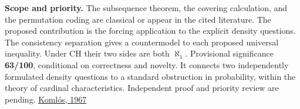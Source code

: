 \documentclass[11pt]{article}
\begin{document}
\textbf{Scope and priority.} The subsequence theorem, the covering calculation, and the permutation coding are classical or appear in the cited literature. The proposed contribution is the forcing application to the explicit density questions. The consistency separation gives a countermodel to each proposed universal inequality. Under CH their two sides are both \(\aleph_1\). Provisional significance \textbf{63/100}, conditional on correctness and novelty. It connects two independently formulated density questions to a standard obstruction in probability, within the theory of cardinal characteristics. Independent proof and priority review are pending. \href{https://doi.org/10.1007/BF02020976}{Komlós, 1967}
\end{document}
